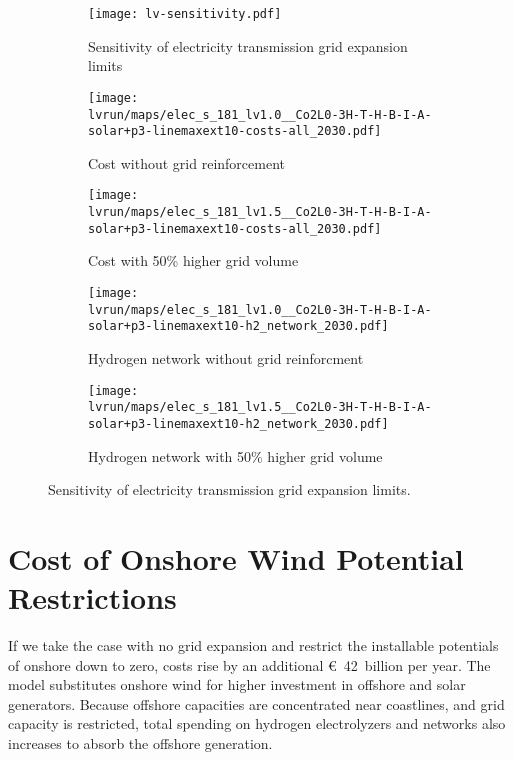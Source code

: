 \begin{figure}
    \centering
    \begin{subfigure}[t]{\textwidth}
        \centering
        \caption{Sensitivity of electricity transmission grid expansion limits}
        \texttt{[image: lv-sensitivity.pdf]}
    \end{subfigure}
    \begin{subfigure}[t]{0.49\textwidth}
        \centering
        \caption{Cost without grid reinforcement}
        \texttt{[image: \\lvrun/maps/elec\_s\_181\_lv1.0\_\_Co2L0-3H-T-H-B-I-A-solar+p3-linemaxext10-costs-all\_2030.pdf]}
    \end{subfigure}
    \begin{subfigure}[t]{0.49\textwidth}
        \centering
        \caption{Cost with 50\% higher grid volume}
        \texttt{[image: \\lvrun/maps/elec\_s\_181\_lv1.5\_\_Co2L0-3H-T-H-B-I-A-solar+p3-linemaxext10-costs-all\_2030.pdf]}
    \end{subfigure}
    \begin{subfigure}[t]{0.49\textwidth}
        \centering
        \caption{Hydrogen network without grid reinforcment}
        \texttt{[image: \\lvrun/maps/elec\_s\_181\_lv1.0\_\_Co2L0-3H-T-H-B-I-A-solar+p3-linemaxext10-h2\_network\_2030.pdf]}
    \end{subfigure}
    \begin{subfigure}[t]{0.49\textwidth}
        \centering
        \caption{Hydrogen network with 50\% higher grid volume}
        \texttt{[image: \\lvrun/maps/elec\_s\_181\_lv1.5\_\_Co2L0-3H-T-H-B-I-A-solar+p3-linemaxext10-h2\_network\_2030.pdf]}
    \end{subfigure}
    \caption{Sensitivity of electricity transmission grid expansion limits.}
    \label{fig:lv-restriction}
\end{figure}
\restoregeometry


\section*{Cost of Onshore Wind Potential Restrictions}
\label{sec:onw}


If we take the case with no grid expansion and restrict the installable
potentials of onshore down to zero, costs rise by an additional \euro~42~billion
per year. The model substitutes onshore wind for
higher investment in offshore and solar generators. Because offshore capacities
are concentrated near coastlines, and grid capacity is restricted, total
spending on hydrogen electrolyzers and networks also increases to absorb the
offshore generation.

